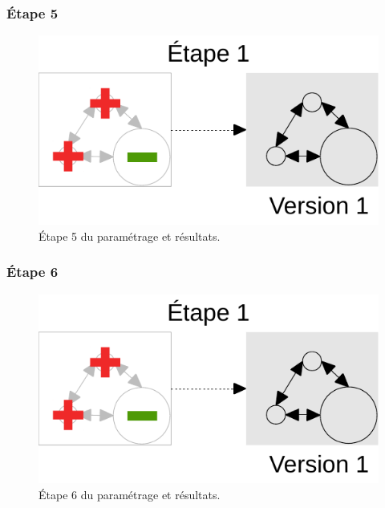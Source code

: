 \subsubsection{Étape 5}
\begin{figure}[H]
	\centering
	\includegraphics[width = \linewidth, page = 5]{img/schemas_etapes_individuelles.pdf}
	\caption{Étape 5 du paramétrage et résultats.}
\end{figure}

\pagebreak
\subsubsection{Étape 6}
\begin{figure}[H]
	\centering
	\includegraphics[width = \linewidth, page = 6]{img/schemas_etapes_individuelles.pdf}
	\caption{Étape 6 du paramétrage et résultats.}
\end{figure}

\pagebreak
